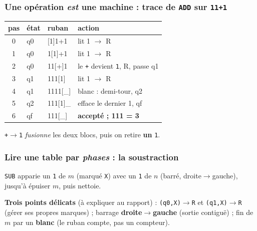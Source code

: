 \documentclass[11pt,a4paper]{scrartcl}
\begin{document}
\subsubsection{Une opération \emph{est} une machine : trace de \texttt{ADD} sur \texttt{11+1}}
\begin{exemple}[\texttt{2+1 = 3}, pas à pas]
\begin{center}\small\ttfamily
\begin{tabular}{@{}clll@{}}
\toprule \rmfamily pas & \rmfamily état & \rmfamily ruban & \rmfamily action\\\midrule
0 & q0 & [1]1+1 & lit 1 $\to$ R\\
1 & q0 & 1[1]+1 & lit 1 $\to$ R\\
2 & q0 & 11[+]1 & \rmfamily le \texttt+ devient \texttt1, R, passe q1\\
3 & q1 & 111[1] & lit 1 $\to$ R\\
4 & q1 & 1111[\_] & \rmfamily blanc : demi-tour, q2\\
5 & q2 & 111[1]\_ & \rmfamily efface le dernier 1, qf\\
6 & qf & 111[\_] & \rmfamily \bfseries accepté ; 111 = 3\\
\bottomrule
\end{tabular}
\end{center}
\texttt+$\to$\texttt1 \emph{fusionne} les deux blocs, puis on retire \textbf{un} \texttt1.
\end{exemple}

\subsubsection{Lire une table par \emph{phases} : la soustraction}
\texttt{SUB} apparie un \texttt1 de $m$ (marqué \texttt X) avec un \texttt1 de $n$ (barré,
droite$\to$gauche), jusqu'à épuiser $m$, puis nettoie.
\begin{center}
\end{center}
\textbf{Trois points délicats} (à expliquer au rapport) : \texttt{(q0,X)$\to$R} et
\texttt{(q1,X)$\to$R} (gérer ses propres marques) ; barrage \textbf{droite$\to$gauche}
(sortie contiguë) ; fin de $m$ par un \textbf{blanc} (le ruban compte, pas un compteur).
\end{document}
